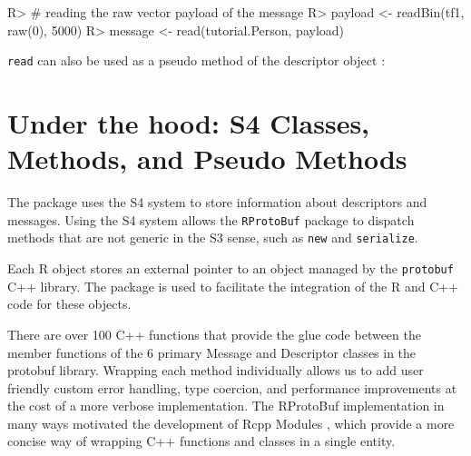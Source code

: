 \documentclass[article]{jss}
\newcommand{\CRANpkg}[1]{\pkg{#1}}
\begin{document}
\begin{Schunk}
\begin{Sinput}
R> # reading the raw vector payload of the message
R> payload <- readBin(tf1, raw(0), 5000)
R> message <- read(tutorial.Person, payload)
\end{Sinput}
\end{Schunk}


\texttt{read} can also be used as a pseudo method of the descriptor
object :

\begin{Schunk}
\end{Schunk}


\section{Under the hood: S4 Classes, Methods, and Pseudo Methods}

The \CRANpkg{RProtoBuf} package uses the S4 system to store
information about descriptors and messages.  Using the S4 system
allows the \texttt{RProtoBuf} package to dispatch methods that are not
generic in the S3 sense, such as \texttt{new} and
\texttt{serialize}.

Each R object stores an external pointer to an object managed by
the \texttt{protobuf} C++ library.
The \CRANpkg{Rcpp} package \citep{eddelbuettel2011rcpp,eddelbuettel2013seamless} is used to
facilitate the integration of the R and C++ code for these objects.

%

There are over 100 C++ functions that provide the glue code between
the member functions of the 6 primary Message and Descriptor classes
in the protobuf library.  Wrapping each method individually allows us
to add user friendly custom error handling, type coercion, and
performance improvements at the cost of a more verbose
implementation.  The RProtoBuf implementation in many ways motivated
the development of Rcpp Modules \citep{eddelbuettel2013exposing},
which provide a more concise way of wrapping C++ functions and classes
in a single entity.
\end{document}
